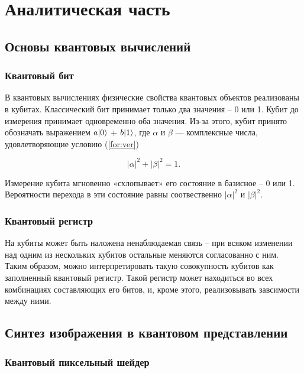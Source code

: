 \chapter{Аналитическая часть}

\section{Основы квантовых вычислений}

\subsection{Квантовый бит}

В квантовых вычислениях физические свойства квантовых объектов реализованы в кубитах. Классический бит принимает только два значения – 0 или 1. Кубит до измерения принимает одновременно оба значения. Из-за этого, кубит принято обозначать выражением $a\lvert0\rangle$ + $b\lvert1\rangle$, где $\alpha$ и $\beta$ — комплексные числа, удовлетворяющие условию (\ref{for:ver})

\begin{equation}
\label{for:ver}
|\alpha|^2 + |\beta|^2 = 1. 
\end{equation} 

Измерение кубита мгновенно «схлопывает»  его состояние в базисное – 0 или 1. Вероятности перехода в эти состояние равны соотвественно $|\alpha|^2$ и $|\beta|^2$. 

\subsection{Квантовый регистр}

На кубиты может быть наложена ненаблюдаемая связь -- при всяком изменении над одним из нескольких кубитов остальные меняются согласованно с ним. Таким образом, можно интерпретировать такую совокупность кубитов как заполненный квантовый регистр. Такой регистр может находиться во всех комбинациях составляющих его битов, и, кроме этого, реализовывать завсимости между ними.

\section{Синтез изображения в квантовом представлении}

\subsection{Квантовый пиксельный шейдер}

